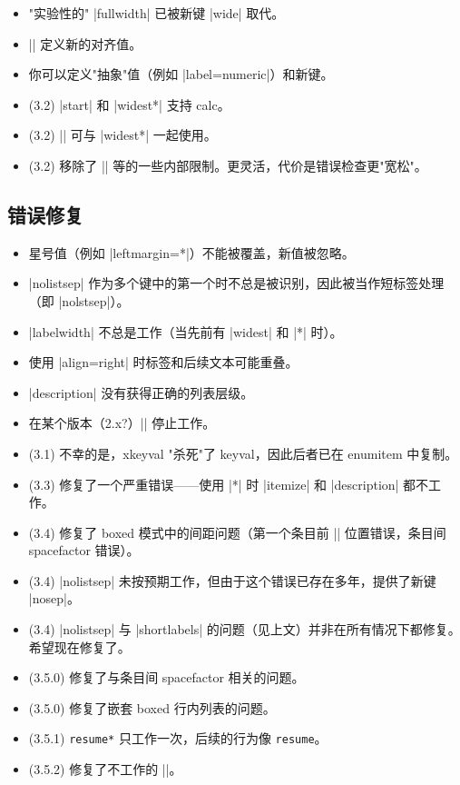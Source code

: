 \documentclass[a4paper]{ltxguide}
\begin{document}
\begin{enumerate}[leftmargin=*]
\begin{enumerate}[leftmargin=\parindent]
\begin{enumerate}[labelindent=\parindent,|\allowbreak
| leftmargin=*,|\allowbreak| label=\Roman*.,|\allowbreak
| widest=III,|\allowbreak| align=left]
\begin{enumerate}[label=\fbox{\arabic*}]
\begin{itemize}
\item "实验性的" |fullwidth| 已被新键 |wide| 取代。

\item|\SetLabelAlign| 定义新的对齐值。

\item 你可以定义"抽象"值（例如 |label=numeric|）和新键。
\end{itemize}

\begin{itemize}
\item (3.2) |start| 和 |widest*| 支持 \textsf{calc}。
\item (3.2) |\value| 可与 |widest*| 一起使用。
\item (3.2) 移除了 |\arabic| 等的一些内部限制。更灵活，代价是错误检查更"宽松"。
\end{itemize}
\subsection{错误修复}

\begin{itemize}
\item 星号值（例如 |leftmargin=*|）不能被覆盖，新值被忽略。
\item |nolistsep| 作为多个键中的第一个时不总是被识别，因此被当作短标签处理（即 |nol\roman*stsep|）。
\item |labelwidth| 不总是工作（当先前有 |widest| 和 |*| 时）。
\item 使用 |align=right| 时标签和后续文本可能重叠。
\item |description| 没有获得正确的列表层级。
\item 在某个版本（2.x?）|\value*| 停止工作。
\item (3.1) 不幸的是，\textsf{xkeyval} "杀死"了 \textsf{keyval}，因此后者已在 \textsf{enumitem} 中复制。
\item (3.3) 修复了一个严重错误——使用 |*| 时 |itemize| 和 |description| 都不工作。
\item (3.4) 修复了 boxed 模式中的间距问题（第一个条目前 |\unskip| 位置错误，条目间 spacefactor 错误）。
\item (3.4) |nolistsep| 未按预期工作，但由于这个错误已存在多年，提供了新键 |nosep|。
\item (3.4) |nolistsep| 与 |shortlabels| 的问题（见上文）并非在所有情况下都修复。希望现在修复了。
\item (3.5.0) 修复了与条目间 spacefactor 相关的问题。
\item (3.5.0) 修复了嵌套 boxed 行内列表的问题。
\item (3.5.1) \texttt{resume*} 只工作一次，后续的行为像 \texttt{resume}。
\item (3.5.2) 修复了不工作的 |\setlist*|。
\end{itemize}


\end{enumerate}
\end{enumerate}
\end{enumerate}
\end{enumerate}
\end{document}
